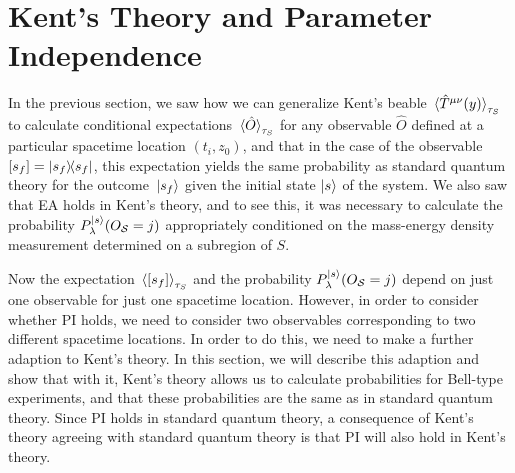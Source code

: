 

\section{Kent's Theory and Parameter Independence\label{kentpi}}
  In the previous section, we saw how we can generalize Kent's beable $\ev*{\hat{T}^{\mu\nu}(y)}_{\tau_S}$ to calculate conditional expectations $\ev*{\hat{O}}_{\tau_S}$ for any observable $\hat{O}$ defined at a particular spacetime location $(t_i, z_0)$, and that in the case of the observable $[s_f]=\dyad{s_f}$, this expectation yields the same probability as standard quantum theory for the outcome $\ket*{s_f}$ given the initial state $\ket{s}$ of the system.  We also saw that  EA holds in Kent's theory, and to see this, it was necessary to calculate the probability $P_\lambda^{\ket{s}}(O_{\mathcal{S}}=j)$ appropriately conditioned on the mass-energy density measurement determined on a subregion of $S$. 
  
  Now the expectation  $\ev*{[s_f]}_{\tau_S}$ and the probability $P_\lambda^{\ket{s}}(O_{\mathcal{S}}=j)$ depend on just one observable for just one spacetime location. However, in order to consider whether PI holds, we need to consider two observables corresponding to two different spacetime locations. In order to do this, we need to make a further adaption to Kent's theory. In this section, we will describe this adaption and show that with it, Kent's theory allows us to calculate probabilities for Bell-type experiments, and that these probabilities are the same as in standard quantum theory. Since PI holds in standard quantum theory,  a consequence of Kent's theory agreeing with standard quantum theory is that PI will also hold in Kent's theory.


